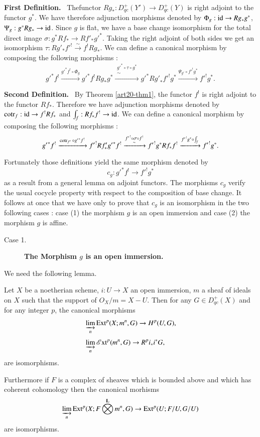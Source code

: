 \medskip
\noindent
{\bf First Definition.}~ The\pageoriginale functor $Rg_{*}:D^{+}_{qc}(Y')\to D^{+}_{qc}(Y)$ is right adjoint to the functor $g^{*}$. We have therefore adjunction morphisms denoted by $\Phi_{g}:\operatorname{\mathrm{id}}\to Rg_{*}g^{*}$, $\Psi_{g}:g^{*}Rg_{*}\to \operatorname{\mathrm{id}}$. Since $g$ is flat, we have a base change isomorphism for the total direct image $\sigma : g^{*}Rf_{*}\to Rf'_{*}{g'}^{*}$. Taking the right adjoint of both sides we get an isomorphism $\tau : Rg'_{*}{f'}^{!}\xrightarrow{\sim}f^{!}Rg_{*}$. We can define a canonical morphism by composing the following morphisms :
$$
{g'}^{*}f^{!}\xrightarrow{{g'}^{*}f^{!}\circ \Phi_{g}}{g'}^{*}f^{!}Rg_{*}g^{*}\xrightarrow{\substack{{g'}^{*}\circ \tau\circ g^{*}\\ \sim}} {g'}^{*}R{g'}_{*}{f'}^{!}g^{*}\xrightarrow{\Psi_{g'}\circ {f'}^{!}g^{*}}{f'}^{!}g^{*}.
$$

\noindent
{\bf Second Definition.}~ By Theorem \ref{art20-thm1}, the functor $f^{!}$ is right adjoint to the functor $Rf_{*}$. Therefore we have adjunction morphisms denoted by $\operatorname{\mathrm{cotr}}_{f}:\operatorname{\mathrm{id}}\to f^{!}Rf_{*}$ and $\int_{f}:Rf_{*}f^{!}\to \operatorname{\mathrm{id}}$. We can define a canonical morphism by composing the following morphisms :
$$
{g'}^{*}f^{!}\xrightarrow{\operatorname{\mathrm{cotr}}_{f'}\circ {g'}^{*}f^{!}}{f'}^{!}Rf'_{*}{g'}^{*}f^{!}\xrightarrow{\substack{{f'}^{!}\circ \sigma \circ f^{!}\\ \sim}} {f'}^{!}g^{*}Rf_{*}f^{!}
\xrightarrow{{f'}^{!}g^{*}\circ \int_{f}}{f'}^{!}g^{*}.
$$

Fortunately those definitions yield the same morphism denoted by
$$
c_{g}:{g'}^{*}f^{!}\to {f'}^{!}g^{*}
$$
as a result from a general lemma on adjoint functors. The morphisms $c_{g}$ verify the usual cocycle property with respect to the composition of base change. It follows at once that we have only to prove that $c_{g}$ is an isomorphism in the two following cases : case (1) the morphism $g$ is an open immersion and case (2) the morphism $g$ is affine.
\begin{description}
\item[Case 1.] {\bf The Morphism \boldmath$g$ is an open immersion.}
\end{description}

We need the following lemma.

\begin{lemma}\label{art20-sec2-lem2}
Let $X$ be a noetherian scheme, $i:U\to X$ an open immersion, $m$ a sheaf of ideals on $X$ such that the support of $O_{X}/m=X-U$. Then for any $G\in D^{+}_{qc}(X)$ and for any integer $p$, the canonical morphisms
\begin{align*}
& \varinjlim_{n} \operatorname{\mathrm{Ext}}^{p}(X;m^{n},G)\to H^{p}(U,G),\\[3pt]
& \varinjlim_{n}\operatorname{\mathscr{E}\mathrm{xt}}^{p}(m^{n},G)\to R^{p}i_{*}i^{*}G,
\end{align*}\pageoriginale
are isomorphisms.

Furthermore if $F$ is a complex of sheaves which is bounded above and which has coherent cohomology then the canonical morhisms
$$
\varinjlim_{n}\operatorname{\mathrm{Ext}}^{p}(X;F\bigotimes\limits^{\mathbf{L}}m^{n},G)\to \operatorname{\mathrm{Ext}}^{p}(U;F/U,G/U)
$$
are isomorphisms.
\end{lemma}

